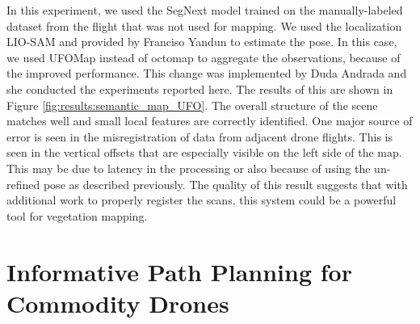 In this experiment, we used the SegNext model trained on the manually-labeled dataset from the flight that was not used for mapping. We used the localization LIO-SAM \cite{Shan2020LIO-SAM:Mapping} and provided by Franciso Yandun to estimate the pose. In this case, we used UFOMap \cite{Duberg2020UFOMap:Unknown} instead of octomap to aggregate the observations, because of the improved performance. This change was implemented by Duda Andrada and she conducted the experiments reported here. The results of this are shown in Figure \ref{fig:results:semantic_map_UFO}. The overall structure of the scene matches well and small local features are correctly identified. One major source of error is seen in the misregistration of data from adjacent drone flights. This is seen in the vertical offsets that are especially visible on the left side of the map. This may be due to latency in the processing or also because of using the un-refined pose as described previously. The quality of this result suggests that with additional work to properly register the scans, this system could be a powerful tool for vegetation mapping. 

\section{Informative Path Planning for Commodity Drones}

